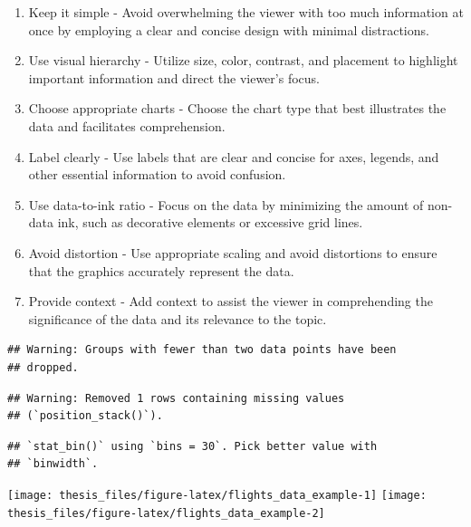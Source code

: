 \documentclass[print]{nuthesis}
\begin{document}
\begin{enumerate}
\def\labelenumi{\arabic{enumi}.}
\item
  Keep it simple - Avoid overwhelming the viewer with too much information at once by employing a clear and concise design with minimal distractions.
\item
  Use visual hierarchy - Utilize size, color, contrast, and placement to highlight important information and direct the viewer's focus.
\item
  Choose appropriate charts - Choose the chart type that best illustrates the data and facilitates comprehension.
\item
  Label clearly - Use labels that are clear and concise for axes, legends, and other essential information to avoid confusion.
\item
  Use data-to-ink ratio - Focus on the data by minimizing the amount of non-data ink, such as decorative elements or excessive grid lines.
\item
  Avoid distortion - Use appropriate scaling and avoid distortions to ensure that the graphics accurately represent the data.
\item
  Provide context - Add context to assist the viewer in comprehending the significance of the data and its relevance to the topic.
\end{enumerate}

\begin{verbatim}
## Warning: Groups with fewer than two data points have been
## dropped.
\end{verbatim}

\begin{verbatim}
## Warning: Removed 1 rows containing missing values
## (`position_stack()`).
\end{verbatim}

\begin{verbatim}
## `stat_bin()` using `bins = 30`. Pick better value with
## `binwidth`.
\end{verbatim}

\begin{center}\texttt{[image: thesis\_files/figure-latex/flights\_data\_example-1]} \texttt{[image: thesis\_files/figure-latex/flights\_data\_example-2]} \end{center}

\end{document}
